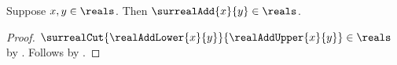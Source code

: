 \begin{theorem}\label{surreal_real_addition_closed}
    Suppose $x,y\in\reals$.
    Then $\surrealAdd{x}{y}\in\reals$.
\end{theorem}
\begin{proof}
    $\surrealCut{\realAddLower{x}{y}}{\realAddUpper{x}{y}}
        \in\reals$ by .
    Follows by .
\end{proof}
